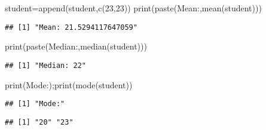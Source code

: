 \documentclass[
]{article}
\newenvironment{Shaded}{\begin{snugshade}}{\end{snugshade}}
\newcommand{\DecValTok}[1]{\textcolor[rgb]{0.00,0.00,0.81}{#1}}
\newcommand{\FunctionTok}[1]{\textcolor[rgb]{0.00,0.00,0.00}{#1}}
\newcommand{\NormalTok}[1]{#1}
\newcommand{\OtherTok}[1]{\textcolor[rgb]{0.56,0.35,0.01}{#1}}
\newcommand{\StringTok}[1]{\textcolor[rgb]{0.31,0.60,0.02}{#1}}
\begin{document}
\begin{Shaded}
\begin{Highlighting}[]
\NormalTok{student}\OtherTok{=}\FunctionTok{append}\NormalTok{(student,}\FunctionTok{c}\NormalTok{(}\DecValTok{23}\NormalTok{,}\DecValTok{23}\NormalTok{))}
\FunctionTok{print}\NormalTok{(}\FunctionTok{paste}\NormalTok{(}\StringTok{\textquotesingle{}Mean:\textquotesingle{}}\NormalTok{,}\FunctionTok{mean}\NormalTok{(student)))}
\end{Highlighting}
\end{Shaded}

\begin{verbatim}
## [1] "Mean: 21.5294117647059"
\end{verbatim}

\begin{Shaded}
\begin{Highlighting}[]
\FunctionTok{print}\NormalTok{(}\FunctionTok{paste}\NormalTok{(}\StringTok{\textquotesingle{}Median:\textquotesingle{}}\NormalTok{,}\FunctionTok{median}\NormalTok{(student)))}
\end{Highlighting}
\end{Shaded}

\begin{verbatim}
## [1] "Median: 22"
\end{verbatim}

\begin{Shaded}
\begin{Highlighting}[]
\FunctionTok{print}\NormalTok{(}\StringTok{\textquotesingle{}Mode:\textquotesingle{}}\NormalTok{);}\FunctionTok{print}\NormalTok{(}\FunctionTok{mode}\NormalTok{(student))}
\end{Highlighting}
\end{Shaded}

\begin{verbatim}
## [1] "Mode:"
\end{verbatim}

\begin{verbatim}
## [1] "20" "23"
\end{verbatim}
\end{document}
